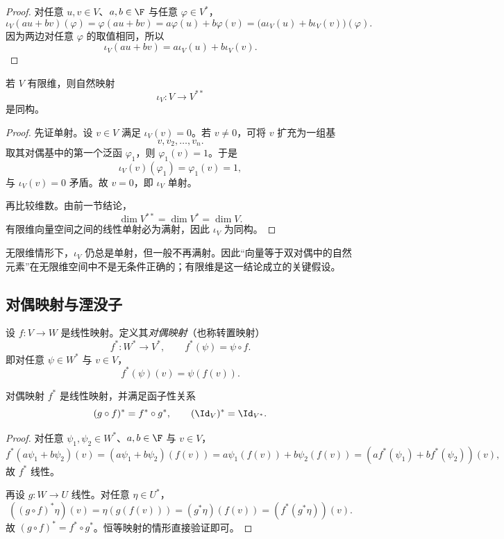 \begin{proof}
对任意 $u,v\in V$、$a,b\in\F$ 与任意 $\varphi\in V^*$，
\[
  \iota_V(au+bv)(\varphi)=\varphi(au+bv)=a\varphi(u)+b\varphi(v)
  =\bigl(a\iota_V(u)+b\iota_V(v)\bigr)(\varphi).
\]
因为两边对任意 $\varphi$ 的取值相同，所以
\[
  \iota_V(au+bv)=a\iota_V(u)+b\iota_V(v).
\]
\end{proof}

\begin{theorem}
若 $V$ 有限维，则自然映射
\[
  \iota_V\colon V\to V^{**}
\]
是同构。
\end{theorem}

\begin{proof}
先证单射。设 $v\in V$ 满足 $\iota_V(v)=0$。若 $v\neq 0$，可将 $v$ 扩充为一组基
\[
  v,v_2,\dots,v_n.
\]
取其对偶基中的第一个泛函 $\varphi_1$，则 $\varphi_1(v)=1$。于是
\[
  \iota_V(v)(\varphi_1)=\varphi_1(v)=1,
\]
与 $\iota_V(v)=0$ 矛盾。故 $v=0$，即 $\iota_V$ 单射。

再比较维数。由前一节结论，
\[
  \dim V^{**}=\dim V^*=\dim V.
\]
有限维向量空间之间的线性单射必为满射，因此 $\iota_V$ 为同构。
\end{proof}

\begin{remark}
无限维情形下，$\iota_V$ 仍总是单射，但一般不再满射。因此“向量等于双对偶中的自然元素”在无限维空间中不是无条件正确的；有限维是这一结论成立的关键假设。
\end{remark}

\subsection{对偶映射与湮没子}

\begin{definition}
设 $f\colon V\to W$ 是线性映射。定义其\emph{对偶映射}（也称转置映射）
\[
  f^*\colon W^*\to V^*,
  \qquad
  f^*(\psi)=\psi\circ f.
\]
即对任意 $\psi\in W^*$ 与 $v\in V$，
\[
  f^*(\psi)(v)=\psi(f(v)).
\]
\end{definition}

\begin{proposition}
对偶映射 $f^*$ 是线性映射，并满足函子性关系
\[
  (g\circ f)^*=f^*\circ g^*,
  \qquad
  (\Id_V)^*=\Id_{V^*}.
\]
\end{proposition}

\begin{proof}
对任意 $\psi_1,\psi_2\in W^*$、$a,b\in\F$ 与 $v\in V$，
\[
  f^*(a\psi_1+b\psi_2)(v)
  =(a\psi_1+b\psi_2)(f(v))
  =a\psi_1(f(v))+b\psi_2(f(v))
  =(af^*(\psi_1)+bf^*(\psi_2))(v),
\]
故 $f^*$ 线性。

再设 $g\colon W\to U$ 线性。对任意 $\eta\in U^*$，
\[
  ((g\circ f)^*\eta)(v)=\eta(g(f(v)))=(g^*\eta)(f(v))=(f^*(g^*\eta))(v).
\]
故 $(g\circ f)^*=f^*\circ g^*$。恒等映射的情形直接验证即可。
\end{proof}

